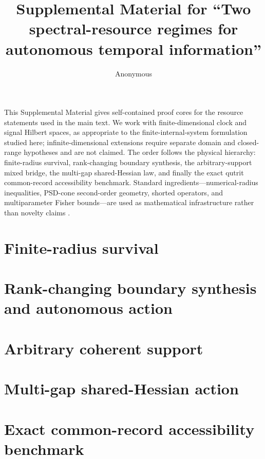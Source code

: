 \documentclass[aps,pra,preprint,nofootinbib]{revtex4-2}
\begin{document}
\title{Supplemental Material for ``Two spectral-resource regimes for autonomous temporal information''}
\author{Anonymous}
\maketitle

This Supplemental Material gives self-contained proof cores for the resource statements used in the main text. We work with finite-dimensional clock and signal Hilbert spaces, as appropriate to the finite-internal-system formulation studied here; infinite-dimensional extensions require separate domain and closed-range hypotheses and are not claimed. The order follows the physical hierarchy: finite-radius survival, rank-changing boundary synthesis, the arbitrary-support mixed bridge, the multi-gap shared-Hessian law, and finally the exact qutrit common-record accessibility benchmark. Standard ingredients---numerical-radius inequalities, PSD-cone second-order geometry, shorted operators, and multiparameter Fisher bounds---are used as mathematical infrastructure rather than novelty claims \cite{BhatiaJain2023,Shapiro1997,BonnansCominettiShapiro1999,AndersonTrapp1975,BraunsteinCaves1994,GillMassar2000}.

\section{Finite-radius survival}


\section{Rank-changing boundary synthesis and autonomous action}



\section{Arbitrary coherent support}


\section{Multi-gap shared-Hessian action}


\section{Exact common-record accessibility benchmark}


\end{document}
